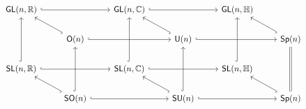 \documentclass[../main.tex]{subfiles}
\begin{document}
\[\begin{tikzcd}
	&&&&& {} \\
	{\mathsf{GL}(n,\mathbb{R})} && {\mathsf{GL}(n,\mathbb{C})} && {\mathsf{GL}(n,\mathbb{H})} \\
	& {\mathsf{O}(n)} && {\mathsf{U}(n)} && {\mathsf{Sp}(n)} && {} \\
	{\mathsf{SL}(n,\mathbb{R})} && {\mathsf{SL}(n,\mathbb{C})} && {\mathsf{SL}(n,\mathbb{H})} \\
	& {\mathsf{SO}(n)} && {\mathsf{SU}(n)} && {\mathsf{Sp}(n)}
	\arrow[hook, from=4-1, to=2-1]
	\arrow[hook, from=3-2, to=2-1]
	\arrow[hook, from=5-2, to=4-1]
	\arrow[hook, from=5-2, to=3-2]
	\arrow[hook, from=4-3, to=2-3]
	\arrow[hook, from=3-4, to=2-3]
	\arrow[hook, from=5-4, to=3-4]
	\arrow[hook, from=5-4, to=4-3]
	\arrow[hook, from=5-2, to=5-4]
	\arrow[hook, from=4-1, to=4-3]
	\arrow[hook, from=3-2, to=3-4]
	\arrow[hook, from=2-1, to=2-3]
	\arrow[hook, from=5-4, to=5-6]
	\arrow[hook, from=4-3, to=4-5]
	\arrow[hook, from=2-3, to=2-5]
	\arrow[hook, from=4-5, to=2-5]
	\arrow[hook, from=5-6, to=4-5]
	\arrow[Rightarrow, no head, from=5-6, to=3-6]
	\arrow[hook, from=3-6, to=2-5]
	\arrow[hook, from=3-4, to=3-6]
\end{tikzcd}\]
\end{document}
